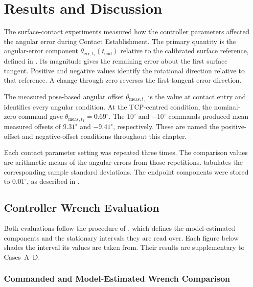 \chapter{Results and Discussion}
\label{ch:results_discussion}

The surface-contact experiments measured how the controller parameters affected
the angular error during Contact Establishment. The primary quantity is the
angular-error component \mbox{\(\theta_{\mathrm{err},t_1}(t_{\mathrm{end}})\)}
relative to the calibrated surface reference, defined in
\mbox{}.
Its magnitude gives the remaining error about the first surface tangent.
Positive and negative values identify the rotational direction relative to that
reference. A change through zero reverses the first-tangent error direction.

The measured pose-based angular offset \mbox{\(\theta_{\mathrm{meas},t_1}\)}
is the value at contact entry and identifies every angular condition.
At the TCP-centred condition, the nominal-zero command gave
\mbox{\(\theta_{\mathrm{meas},t_1}=0.69^\circ\)}.
The \mbox{\(10^\circ\)} and \mbox{\(-10^\circ\)} commands produced mean measured
offsets of \mbox{\(9.31^\circ\)} and \mbox{\(-9.41^\circ\)}, respectively.
These are named the positive-offset and negative-offset conditions throughout
this chapter.

Each contact parameter setting was repeated three times. The comparison values
are arithmetic means of the angular errors from those repetitions.
 tabulates the corresponding sample standard
deviations. The endpoint components were stored to \mbox{\(0.01^\circ\)}, as
described in \mbox{}.

\section{Controller Wrench Evaluation}
\label{sec:results_wrench_evaluation}

Both evaluations follow the procedure of
\mbox{}, which defines the model-estimated
components and the stationary intervals they are read over. Each figure below
shades the interval its values are taken from. Their results are supplementary
to Cases~A--D.

\subsection{Commanded and Model-Estimated Wrench Comparison}
\label{subsec:results_wrench_comparison}

